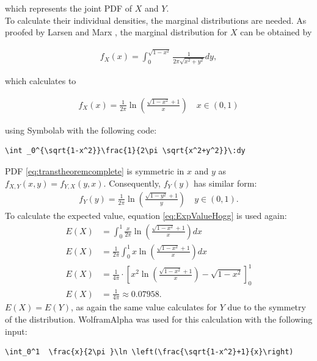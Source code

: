 which represents the joint PDF of $X$ and $Y$.\\
To calculate their individual densities, the marginal distributions are needed. As proofed by Larsen and Marx \cite[Theorem~3.7.2]{larsen2005introduction}, the marginal distribution for $X$ can be obtained by 

\begin{equation}
\begin{split}
f_{X}(x) = \int_{0}^{\sqrt{1-x^2}}\frac{1}{2\pi\sqrt{x^2+y^2}} dy,
\end{split}
\label{eq:marginalX}
\end{equation}

which calculates to 

\begin{equation}
\begin{split}
f_{X}(x) = \frac{1}{2\pi }\ln \left(\frac{\sqrt{1-x^2}+1}{x}\right) \quad x \in (0,1)
\end{split}
\label{eq:marginalXcalculated}
\end{equation}

using Symbolab \cite{symbolab} with the following code:
\begin{lstlisting}
\int _0^{\sqrt{1-x^2}}\frac{1}{2\pi \sqrt{x^2+y^2}}\:dy
\end{lstlisting}

PDF \eqref{eq:transtheoremcomplete} is symmetric in $x$ and $y$ as $f_{X,Y}(x,y) = f_{Y,X}(y,x)$. Consequently, $f_Y(y)$ has similar form:
\begin{equation}
\begin{split}
f_{Y}(y) = \frac{1}{2\pi }\ln\left(\frac{\sqrt{1-y^2}+1}{y}\right) \quad y \in (0,1).
\end{split}
\label{eq:marginalYcalculated}
\end{equation}
To calculate the expected value, equation \eqref{eq:ExpValueHogg} is used again:
\begin{equation}
\begin{split}
E(X) &= \int_0^1  \frac{x}{2\pi }\ln \left(\frac{\sqrt{1-x^2}+1}{x}\right) dx\\
E(X) &= \frac{1}{2\pi}\int_0^1  x\ln \left(\frac{\sqrt{1-x^2}+1}{x}\right) dx\\
E(X) &= \frac{1}{4\pi } \cdot \left[x^2\ln \left(\frac{\sqrt{1-x^2}+1}{x}\right)-\sqrt{1-x^2}\right]_0^1\\
E(X)&= \frac{1}{4\pi} \approx 0.07958.
\end{split}
\label{eq:expvalF_X}
\end{equation}
$E(X) = E(Y)$, as again the same value calculates for $Y$ due to the symmetry of the distribution.
WolframAlpha \cite{wolfalph} was used for this calculation with the following input:
\begin{lstlisting}
\int_0^1  \frac{x}{2\pi }\ln \left(\frac{\sqrt{1-x^2}+1}{x}\right)
\end{lstlisting}

